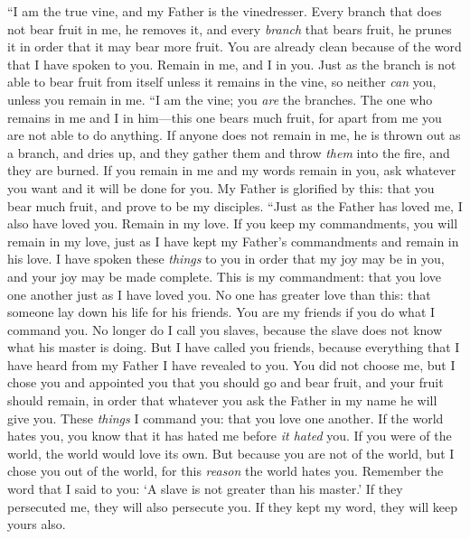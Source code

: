 \begin{biblechapter} %
 “I am the true vine, and my Father is the vinedresser.
\verse Every branch that does not bear fruit in me, he removes it, and every \textit{branch} that bears fruit, he prunes it in order that it may bear more fruit.
\verse You are already clean because of the word that I have spoken to you.
\verse Remain in me, and I in you. Just as the branch is not able to bear fruit from itself unless it remains in the vine, so neither \textit{can} you, unless you remain in me.
\verse “I am the vine; you \textit{are} the branches. The one who remains in me and I in him—this one bears much fruit, for apart from me you are not able to do anything.
\verse If anyone does not remain in me, he is thrown out as a branch, and dries up, and they gather them and throw \textit{them} into the fire, and they are burned.
\verse If you remain in me and my words remain in you, ask whatever you want and it will be done for you.
\verse My Father is glorified by this: that you bear much fruit, and prove to be my disciples.
\verse “Just as the Father has loved me, I also have loved you. Remain in my love.
\verse If you keep my commandments, you will remain in my love, just as I have kept my Father’s commandments and remain in his love.
\verse I have spoken these \textit{things} to you in order that my joy may be in you, and your joy may be made complete.
\verse This is my commandment: that you love one another just as I have loved you.
\verse No one has greater love than this: that someone lay down his life for his friends.
\verse You are my friends if you do what I command you.
\verse No longer do I call you slaves, because the slave does not know what his master is doing. But I have called you friends, because everything that I have heard from my Father I have revealed to you.
\verse You did not choose me, but I chose you and appointed you that you should go and bear fruit, and your fruit should remain, in order that whatever you ask the Father in my name he will give you.
\verse These \textit{things} I command you: that you love one another.
 If the world hates you, you know that it has hated me before \textit{it hated} you.
\verse If you were of the world, the world would love its own. But because you are not of the world, but I chose you out of the world, for this \textit{reason} the world hates you.
\verse Remember the word that I said to you: ‘A slave is not greater than his master.’ If they persecuted me, they will also persecute you. If they kept my word, they will keep yours also.

\end{biblechapter}
